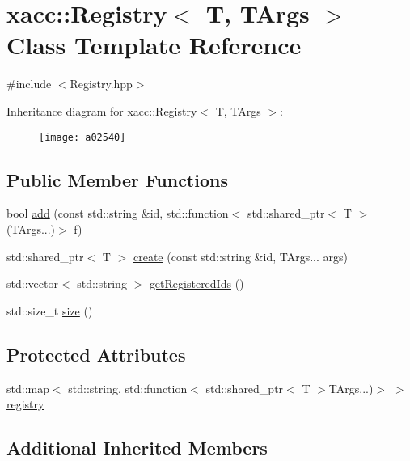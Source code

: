 \hypertarget{a02540}{}\section{xacc\+:\+:Registry$<$ T, T\+Args $>$ Class Template Reference}
\label{a02540}


{\ttfamily \#include $<$Registry.\+hpp$>$}

Inheritance diagram for xacc\+:\+:Registry$<$ T, T\+Args $>$\+:\begin{figure}[H]
\begin{center}
\leavevmode
\texttt{[image: a02540]}
\end{center}
\end{figure}
\subsection*{Public Member Functions}
\begin{DoxyCompactItemize}
\item 
bool \hyperlink{a02540_a9aa172c2603171db067b40bd62ba53c6}{add} (const std\+::string \&id, std\+::function$<$ std\+::shared\+\_\+ptr$<$ T $>$(T\+Args...)$>$ f)
\item 
std\+::shared\+\_\+ptr$<$ T $>$ \hyperlink{a02540_a3e71cc8d0effd065252608ee1ccdf207}{create} (const std\+::string \&id, T\+Args... args)
\item 
std\+::vector$<$ std\+::string $>$ \hyperlink{a02540_a8bff6f5c50534375abc4026662d69d2e}{get\+Registered\+Ids} ()
\item 
std\+::size\+\_\+t \hyperlink{a02540_a2352dd7c6c85ae5c5e232b577dfa2544}{size} ()
\end{DoxyCompactItemize}
\subsection*{Protected Attributes}
\begin{DoxyCompactItemize}
\item 
std\+::map$<$ std\+::string, std\+::function$<$ std\+::shared\+\_\+ptr$<$ T $>$T\+Args...)$>$ $>$ \hyperlink{a02540_a46460ecacc7facb6936b3c1ec6d618d7}{registry}
\end{DoxyCompactItemize}
\subsection*{Additional Inherited Members}



